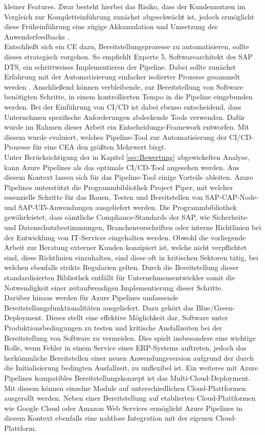 kleiner Features. Zwar besteht hierbei das Risiko, dass der Kundennutzen im Vergleich zur Kompletteinführung zunächst abgeschwächt ist, jedoch ermöglicht diese Früheinführung eine zügige Akkumulation und Umsetzung des Anwenderfeedbacks \cite[9]{Halstenberg.2020}.\\ 
Entschließt sich ein CE dazu, Bereitstellungsprozesse zu automatisieren, sollte dieses strategisch vorgehen. So empfiehlt Experte 5, Softwarearchitekt des SAP DTS, ein schrittweises Implementieren der Pipeline. Dabei sollte zunächst Erfahrung mit der Automatisierung einfacher isolierter Prozesse gesammelt werden \cite[Z. 8 ff.]{SoftwareArchitektSAPDTSIntegration.}. Anschließend können verbleibende, zur Bereitstellung von Software benötigten Schritte, in einem kontrollierten Tempo in die Pipeline eingebunden werden. Bei der Einführung von CI/CD ist dabei ebenso entscheidend, dass Unternehmen spezifische Anforderungen abdeckende Tools verwenden. Dafür wurde im Rahmen dieser Arbeit ein Entscheidungs-Framework entworfen. Mit diesem wurde evaluiert, welches Pipeline-Tool zur Automatisierung der CI/CD-Prozesse für eine CEA den größten Mehrwert birgt.\\ Unter Berücksichtigung der in Kapitel \ref{sec:Bewertung} abgewickelten Analyse, kann Azure Pipelines als das optimale CI/CD-Tool angesehen werden. Aus diesem Kontext lassen sich für das Pipeline-Tool einige Vorteile ableiten. Azure Pipelines unterstützt die Programmbibliothek Project Piper, mit welcher essenzielle Schritte für das Bauen, Testen und Bereitstellen von SAP-CAP-Node- und SAP-UI5-Anwendungen ausgeliefert werden. Die Programmbibliothek gewährleistet, dass sämtliche Compliance-Standards der SAP, wie Sicherheits- und Datenschutzbestimmungen, Branchenvorschriften oder interne Richtlinien bei der Entwicklung von IT-Services eingehalten werden. Obwohl die vorliegende Arbeit zur Beratung externer Kunden konzipiert ist, welche nicht verpflichtet sind, diese Richtlinien einzuhalten, sind diese oft in kritischen Sektoren tätig, bei welchen ebenfalls strikte Regularien gelten. Durch die Bereitstellung dieser standardisierten Bibliothek entfällt für Unternehmensentwickler somit die Notwendigkeit einer zeitaufwendigen Implementierung dieser Schritte.\\ Darüber hinaus werden für Azure Pipelines umfassende Bereitstellungsfunktionalitäten ausgeliefert. Dazu gehört das Blue/Green-Deployment. Dieses stellt eine effektive Möglichkeit dar, Software unter Produktionsbedingungen zu testen und kritische Ausfallzeiten bei der Bereitstellung von Software zu vermeiden. Dies spielt insbesondere eine wichtige Rolle, wenn Fehler in einem Service eines ERP-Systems auftreten, jedoch das herkömmliche Bereitstellen einer neuen Anwendungsversion aufgrund der durch die Initialisierung  bedingten Ausfallzeit, zu unflexibel ist. Ein weiteres mit Azure Pipelines kompatibles Bereitstellungskonzept ist das Multi-Cloud-Deployment. Mit diesem können einzelne Module auf unterschiedlichen Cloud-Plattformen ausgerollt werden. Neben einer Bereitstellung auf etablierten Cloud-Plattformen wie Google Cloud oder Amazon Web Services ermöglicht Azure Pipelines in diesem Kontext ebenfalls eine nahtlose Integration mit der eigenen Cloud-Plattform.\\
